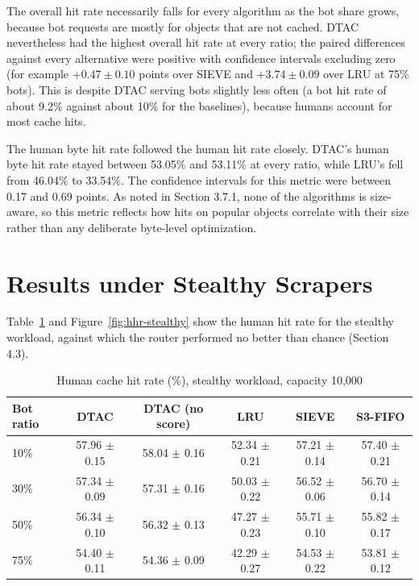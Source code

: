 The overall hit rate necessarily falls for every algorithm as the bot share grows, because bot requests are mostly for objects that are not cached. DTAC nevertheless had the highest overall hit rate at every ratio; the paired differences against every alternative were positive with confidence intervals excluding zero (for example $+0.47 \pm 0.10$ points over SIEVE and $+3.74 \pm 0.09$ over LRU at 75\% bots). This is despite DTAC serving bots slightly less often (a bot hit rate of about 9.2\% against about 10\% for the baselines), because humans account for most cache hits.

The human byte hit rate followed the human hit rate closely. DTAC's human byte hit rate stayed between 53.05\% and 53.11\% at every ratio, while LRU's fell from 46.04\% to 33.54\%. The confidence intervals for this metric were between 0.17 and 0.69 points. As noted in Section 3.7.1, none of the algorithms is size-aware, so this metric reflects how hits on popular objects correlate with their size rather than any deliberate byte-level optimization.

\section{Results under Stealthy Scrapers}
Table~\ref{tab:hhr-stealthy} and Figure~\ref{fig:hhr-stealthy} show the human hit rate for the stealthy workload, against which the router performed no better than chance (Section 4.3).

\begin{table}[htbp]
    \centering
    \caption{Human cache hit rate (\%), stealthy workload, capacity 10{,}000}
    \label{tab:hhr-stealthy}
    \small
    \begin{tabular}{lccccc}
        \toprule
        Bot ratio & DTAC & DTAC (no score) & LRU & SIEVE & S3-FIFO \\
        \midrule
        10\% & 57.96 $\pm$ 0.15 & 58.04 $\pm$ 0.16 & 52.34 $\pm$ 0.21 & 57.21 $\pm$ 0.14 & 57.40 $\pm$ 0.21 \\
        30\% & 57.34 $\pm$ 0.09 & 57.31 $\pm$ 0.16 & 50.03 $\pm$ 0.22 & 56.52 $\pm$ 0.06 & 56.70 $\pm$ 0.14 \\
        50\% & 56.34 $\pm$ 0.10 & 56.32 $\pm$ 0.13 & 47.27 $\pm$ 0.23 & 55.71 $\pm$ 0.10 & 55.82 $\pm$ 0.17 \\
        75\% & 54.40 $\pm$ 0.11 & 54.36 $\pm$ 0.09 & 42.29 $\pm$ 0.27 & 54.53 $\pm$ 0.22 & 53.81 $\pm$ 0.12 \\
        \bottomrule
    \end{tabular}
\end{table}

